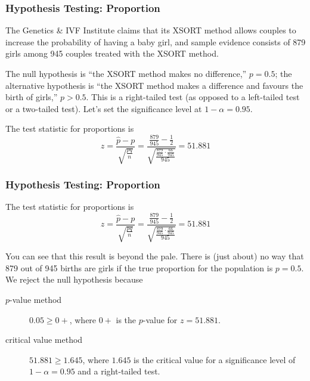 \documentclass[xcolor=dvipsnames]{beamer}
\begin{document}
\begin{frame}
  \frametitle{Hypothesis Testing: Proportion}
   The Genetics \& IVF Institute claims
  that its XSORT method allows couples to increase the probability of
  having a baby girl, and sample evidence consists of 879 girls among
  945 couples treated with the XSORT method.

  The null hypothesis is ``the XSORT method makes no difference,''
  $p=0.5$; the alternative hypothesis is ``the XSORT method makes a
  difference and favours the birth of girls,'' $p>0.5$. This is a
  \alert{right-tailed test} (as opposed to a \alert{left-tailed test}
  or a \alert{two-tailed test}). Let's set the significance level at
  $1-\alpha=0.95$.

The test statistic for proportions is 
\begin{equation}
  \label{eq:bahhixie}
  z=\frac{\hat{p}-p}{\sqrt{\frac{pq}{n}}}=\frac{\frac{879}{945}-\frac{1}{2}}{\sqrt{\frac{\frac{879}{945}\cdot\frac{66}{945}}{945}}}=51.881
\end{equation}
\end{frame}

\begin{frame}
  \frametitle{Hypothesis Testing: Proportion}
The test statistic for proportions is 
\begin{equation}
  \label{eq:aegaasee}
  z=\frac{\hat{p}-p}{\sqrt{\frac{pq}{n}}}=\frac{\frac{879}{945}-\frac{1}{2}}{\sqrt{\frac{\frac{879}{945}\cdot\frac{66}{945}}{945}}}=51.881
\end{equation}

You can see that this result is beyond the pale. There is (just about)
no way that 879 out of 945 births are girls if the true proportion for
the population is $p=0.5$. We reject the null hypothesis because
\begin{description}
\item[$p$-value method] $0.05\geq{}0+$, where $0+$ is the $p$-value for
  $z=51.881$.
\item[critical value method] $51.881\geq{}1.645$, where $1.645$ is the
  critical value for a significance level of $1-\alpha=0.95$ and a
  right-tailed test.
\end{description}
\end{frame}
\end{document}
